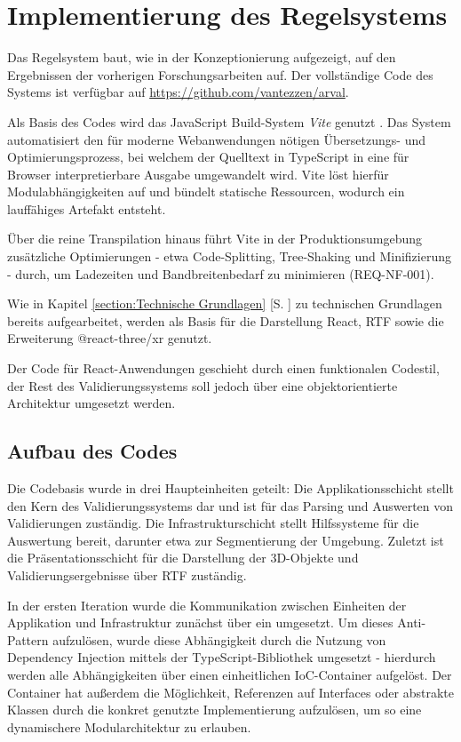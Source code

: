 \section{Implementierung des Regelsystems}\label{section:Implementierung des Constraint-Systems}

Das Regelsystem baut, wie in der Konzeptionierung aufgezeigt, auf den Ergebnissen der vorherigen Forschungsarbeiten auf. Der vollständige Code des Systems ist verfügbar auf \url{https://github.com/vantezzen/arval}.

Als Basis des Codes wird das JavaScript Build-System \textit{Vite} genutzt \parencite{voidzeroinc.Vite2025}. Das System automatisiert den für moderne Webanwendungen nötigen Übersetzungs- und Optimierungsprozess, bei welchem der Quelltext in TypeScript in eine für Browser interpretierbare Ausgabe umgewandelt wird. Vite löst hierfür Modulabhängigkeiten auf und bündelt statische Ressourcen, wodurch ein lauffähiges Artefakt entsteht.

Über die reine Transpilation hinaus führt Vite in der Produktionsumgebung zusätzliche Optimierungen - etwa Code-Splitting, Tree-Shaking und Minifizierung - durch, um Ladezeiten und Bandbreitenbedarf zu minimieren (REQ-NF-001).

\medskip

Wie in Kapitel \ref{section:Technische Grundlagen} [S. \pageref{section:Technische Grundlagen}] zu technischen Grundlagen bereits aufgearbeitet, werden als Basis für die Darstellung React, RTF sowie die Erweiterung @react-three/xr genutzt.

Der Code für React-Anwendungen geschieht durch einen funktionalen Codestil, der Rest des Validierungssystems soll jedoch über eine objektorientierte Architektur umgesetzt werden.

\subsection{Aufbau des Codes}

Die Codebasis wurde in drei Haupteinheiten geteilt: Die Applikationsschicht stellt den Kern des Validierungssystems dar und ist für das Parsing und Auswerten von Validierungen zuständig. Die Infrastrukturschicht stellt Hilfssysteme für die Auswertung bereit, darunter etwa zur Segmentierung der Umgebung. Zuletzt ist die Präsentationsschicht für die Darstellung der 3D-Objekte und Validierungsergebnisse über RTF zuständig.

In der ersten Iteration wurde die Kommunikation zwischen Einheiten der Applikation und Infrastruktur zunächst über ein  umgesetzt. Um dieses Anti-Pattern aufzulösen, wurde diese Abhängigkeit durch die Nutzung von Dependency Injection mittels der TypeScript-Bibliothek  umgesetzt - hierdurch werden alle Abhängigkeiten über einen einheitlichen IoC-Container aufgelöst. Der Container hat außerdem die Möglichkeit, Referenzen auf Interfaces oder abstrakte Klassen durch die konkret genutzte Implementierung aufzulösen, um so eine dynamischere Modularchitektur zu erlauben.

